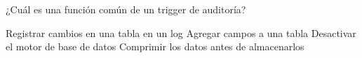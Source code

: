 \question[1] ¿Cuál es una función común de un trigger de auditoría?
\begin{choices}
\CorrectChoice Registrar cambios en una tabla en un log
\choice Agregar campos a una tabla
\choice Desactivar el motor de base de datos
\choice Comprimir los datos antes de almacenarlos
\end{choices}